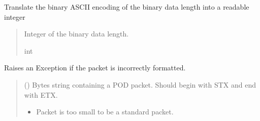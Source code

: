 \documentclass[letterpaper,10pt,english]{sphinxmanual}
\begin{document}
\begin{fulllineitems}
\begin{fulllineitems}
\begin{quote}
\begin{description}
\end{description}\end{quote}

\end{fulllineitems}


\begin{fulllineitems}
\label{\detokenize{PodApi.Packets:PodApi.Packets.Binary.PacketBinary.BinaryLength}}
\pysigstartsignatures
{}
\pysigstopsignatures
\sphinxAtStartPar
Translate the binary ASCII encoding of the binary data length         into a readable integer
\begin{quote}\begin{description}
\sphinxAtStartPar
Integer of the binary data length.

\sphinxAtStartPar
int

\end{description}\end{quote}

\end{fulllineitems}


\begin{fulllineitems}
\label{\detokenize{PodApi.Packets:PodApi.Packets.Binary.PacketBinary.CheckIfPacketIsValid}}
\pysigstartsignatures
{}
\pysigstopsignatures
\sphinxAtStartPar
Raises an Exception if the packet is incorrectly formatted.
\begin{quote}\begin{description}
\sphinxAtStartPar
{} () \textendash{} Bytes string containing a POD packet. Should begin with STX                 and end with ETX.

\begin{itemize}
\item {} 
\sphinxAtStartPar
{} \textendash{} Packet is too small to be a standard packet.


\end{itemize}
\end{description}
\end{quote}
\end{fulllineitems}
\end{fulllineitems}
\end{document}
